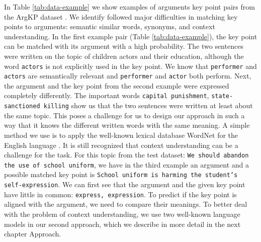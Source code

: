 In Table \ref{tab:data-example} we show examples of arguments key point pairs from the ArgKP dataset \cite{Bar-HaimEFKLS2020}. 
We identify followed major difficulties in matching key points to arguments: semantic similar words, synonyms, and context understanding.
In the first example pair (Table \ref{tab:data-example}), the key point can be matched with its argument with a high probability. 
The two sentences were written on the topic of children actors and their education, although the word \texttt{actors} is not explicitly used in the key point. 
We know that \texttt{performer} and \texttt{actors} are semantically relevant and \texttt{performer} and \texttt{actor} both perform. Next, the argument and the key point from the second example were expressed completely differently. 
The important words \texttt{capital punishment}, \texttt{state-sanctioned killing} show us that the two sentences were written at least about the same topic. 
This poses a challenge for us to design our approach in such a way that it knows the different written words with the same meaning. 
A simple method we use is to apply the well-known lexical database WordNet for the English language \cite{Miller1995}.
It is still recognized that context understanding can be a challenge for the task. For this topic from the test dataset:
\texttt{We should abandon the use of school uniform}, we have in the third example an argument and a possible matched key point is \texttt{School uniform is harming the student's self-expression}. 
We can first see that the argument and the given key point have little in common: \texttt{express, expression}. 
To predict if the key point is aligned with the argument, we need to compare their meanings. 
To better deal with the problem of context understanding, we use two well-known language models in our second approach, which we describe in more detail in the next chapter Approach.
